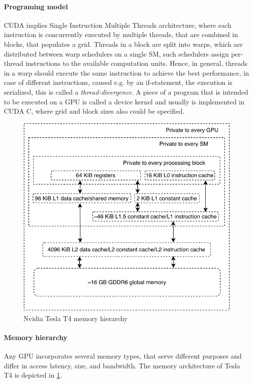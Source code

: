 \paragraph*{Programing model}
CUDA implies Single Instruction Multiple Threads architecture, where each instruction is concurrently executed by multiple threads, that are combined in blocks, that populates a grid. Threads in a 
block are split into warps, which are distributed between warp schedulers on a single SM, such schedulers assign per-thread instructions to the available computation units. Hence, in general, threads
 in a warp should execute the same instruction to achieve the best performance, in case of different instructions, caused e.g. by an if-statement, the execution is serialized, this is called a \emph{thread-divergence}.
  A piece of a program that is intended to be executed on a GPU is called a device kernel and usually is implemented in CUDA C, where grid and block sizes also could be specified.

\begin{figure}[h!]
    \centering
    \includegraphics[width=\linewidth]{figures/TeslaT4Mem.pdf}
    \caption{Nvidia Tesla T4 memory hierarchy~\cite{TeslaT4Bench}}
    \label{fig:t4_mem}
\end{figure}

\paragraph*{Memory hierarchy}
Any GPU incorporates several memory types, that serve different purposes 
and differ in access latency, size, and bandwidth.
The memory architecture of Tesla T4 is depicted in \ref{fig:t4_mem}.

